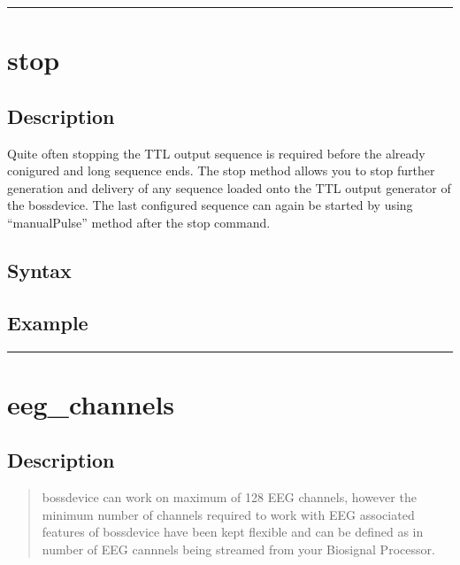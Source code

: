 \documentclass[letterpaper,10pt,english]{sphinxmanual}
\begin{document}
\bigskip\hrule\bigskip



\section{stop}
\label{\detokenize{4_api_documentation:stop}}

\subsection{Description}
\label{\detokenize{4_api_documentation:id10}}
\sphinxAtStartPar
Quite often stopping the TTL output sequence is required before the already conigured and long sequence ends. The stop method allows you to stop further generation and delivery of any sequence loaded onto the TTL output generator of the bossdevice.
The last configured sequence can again be started by using “manualPulse” method after the stop command.


\subsection{Syntax}
\label{\detokenize{4_api_documentation:id11}}
\begin{sphinxVerbatim}[commandchars=\\\{\}]
\end{sphinxVerbatim}


\subsection{Example}
\label{\detokenize{4_api_documentation:id12}}
\begin{sphinxVerbatim}[commandchars=\\\{\}]
\end{sphinxVerbatim}


\bigskip\hrule\bigskip



\section{eeg\_channels}
\label{\detokenize{4_api_documentation:eeg-channels}}

\subsection{Description}
\label{\detokenize{4_api_documentation:id13}}\begin{quote}

\sphinxAtStartPar
bossdevice can work on maximum of 128 EEG channels, however the minimum number of channels required to work with EEG associated features of bossdevice have been kept flexible and can be defined as in number of EEG cannnels being streamed from your Biosignal Processor.
\end{quote}
\end{document}
